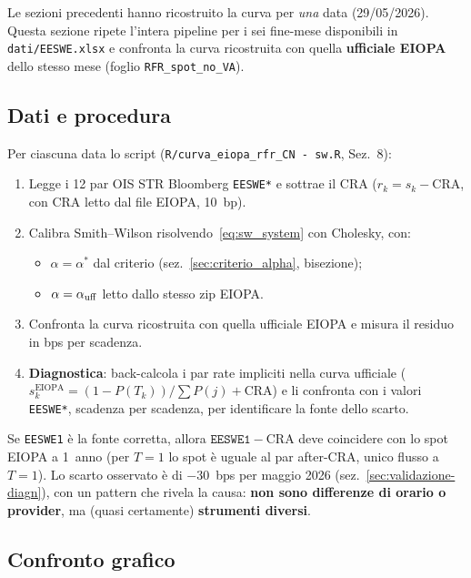 \documentclass[11pt,a4paper]{article}
\theoremstyle{plain}
\theoremstyle{definition}
\theoremstyle{remark}
\newcommand{\CRA}{\mathrm{CRA}}
\begin{document}
Le sezioni precedenti hanno ricostruito la curva per \emph{una} data (29/05/2026).
Questa sezione ripete l'intera pipeline per i sei fine-mese disponibili in
\texttt{dati/EESWE.xlsx} e confronta la curva ricostruita con quella
\textbf{ufficiale EIOPA} dello stesso mese (foglio \texttt{RFR\_spot\_no\_VA}).

\subsection{Dati e procedura}
\label{sec:validazione-dati}

Per ciascuna data lo script (\texttt{R/curva\_eiopa\_rfr\_CN\ -\ sw.R}, Sez.~8):
\begin{enumerate}
  \item Legge i 12 par OIS \texteuro{}STR Bloomberg \texttt{EESWE*} e sottrae il CRA
        ($r_k = s_k - \CRA$, con CRA letto dal file EIOPA, 10~bp).
  \item Calibra Smith--Wilson risolvendo~\eqref{eq:sw_system} con Cholesky, con:
  \begin{itemize}
    \item $\alpha = \alpha^*$ dal criterio (sez.~\ref{sec:criterio_alpha}, bisezione);
    \item $\alpha = \alpha_{\rm uff}$ letto dallo stesso zip EIOPA.
  \end{itemize}
  \item Confronta la curva ricostruita con quella ufficiale EIOPA e misura il residuo
        in bps per scadenza.
  \item \textbf{Diagnostica}: back-calcola i par rate impliciti nella curva ufficiale
        ($s_k^{\text{EIOPA}} = (1 - P(T_k))/\sum P(j) + \CRA$) e li confronta con i
        valori \texttt{EESWE*}, scadenza per scadenza, per identificare la fonte dello scarto.
\end{enumerate}

\begin{keybox}
Se \texttt{EESWE1} \`e la fonte corretta, allora $\texttt{EESWE1} - \CRA$ deve coincidere
con lo spot EIOPA a 1~anno (per $T=1$ lo spot \`e uguale al par after-CRA, unico flusso
a $T=1$). Lo scarto osservato \`e di $-30$~bps per maggio 2026 (sez.~\ref{sec:validazione-diagn}),
con un pattern che rivela la causa: \textbf{non sono differenze di orario o provider}, ma
(quasi certamente) \textbf{strumenti diversi}.
\end{keybox}

\subsection{Confronto grafico}
\end{document}
